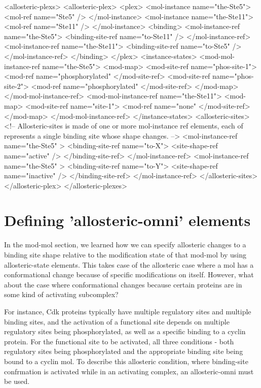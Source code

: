 \begin{ExampleXML}
<allosteric-plexs>
  <allosteric-plex>
    <plex>
      <mol-instance name="the-Ste5">
	<mol-ref name="Ste5" />
      </mol-instance>
      <mol-instance name="the-Ste11">
	<mol-ref name="Ste11" />
      </mol-instance>
      <binding>
	<mol-instance-ref name="the-Ste5">
	  <binding-site-ref name="to-Ste11" />
	</mol-instance-ref>
	<mol-instance-ref name="the-Ste11">
	  <binding-site-ref name="to-Ste5" />
	</mol-instance-ref>
      </binding>
    </plex>
    <instance-states>
      <mod-mol-instance-ref name="the-Ste5">
	<mod-map>
	  <mod-site-ref name="phos-site-1">
	    <mod-ref name="phosphorylated"
	  </mod-site-ref>
	  <mod-site-ref name="phos-site-2">
	    <mod-ref name="phosphorylated"
	  </mod-site-ref>
	</mod-map>
      </mod-mol-instance-ref>
      <mod-mol-instance-ref name="the-Ste11">
	<mod-map>
	  <mod-site-ref name="site-1">
	    <mod-ref name="none"
	  </mod-site-ref>
	</mod-map>
      </mod-mol-instance-ref>
    </instance-states>
    <allosteric-sites>
      <!-- Allosteric-sites is made of one or more mol-instance ref 
           elements, each of represents a single binding site whose 
	   shape changes. -->
      <mol-instance-ref name="the-Ste5" >
	<binding-site-ref name="to-X">
	  <site-shape-ref name="active" />
	</binding-site-ref>
      </mol-instance-ref>
      <mol-instance-ref name="the-Ste5" >
	<binding-site-ref name="to-Y">
	  <site-shape-ref name="inactive" />
	</binding-site-ref>
      </mol-instance-ref>
    </allosteric-sites>
  </allosteric-plex>
</allosteric-plexes>

\end{ExampleXML}


\section{Defining 'allosteric-omni' elements}

In the mod-mol section, we learned how we can specify allosteric
changes to a binding site shape relative to the modification state of
that mod-mol by using allosteric-state elements. This takes
case of the allosteric case where a mol has a conformational change
because of specific modifications on itself.  However, what about the
case where conformational changes because certain proteins are in some
kind of activating subcomplex?

For instance, Cdk proteins typically have multiple regulatory sites
and multiple binding sites, and the activation of a functional site
depends on multiple regulatory sites being phosphorylated, as well as
a specific binding to a cyclin protein.  For the functional
site to be activated, all three conditions - both regulatory sites being
phosphorylated and the appropriate binding site being bound to a
cyclin mol.  To describe this allosteric condition, where binding-site
confrmation is activated while in an activating complex, an
allosteric-omni must be used. 

